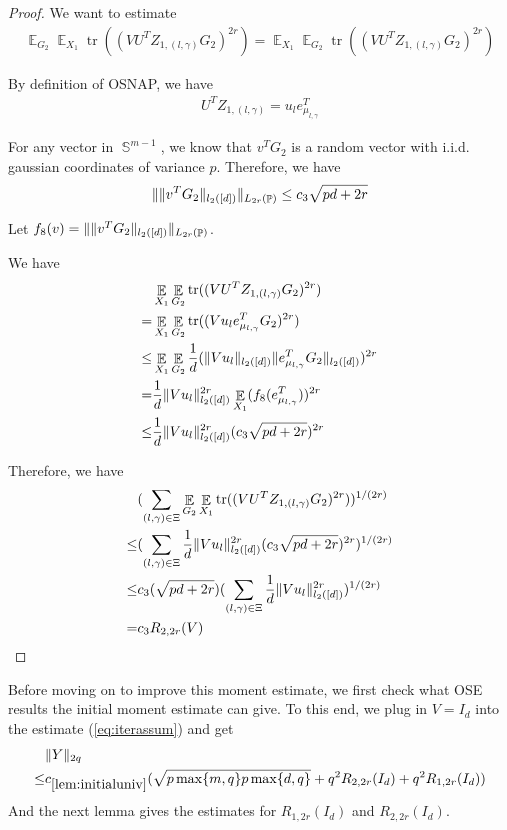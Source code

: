 \documentclass[11pt]{amsart}
\numberwithin{equation}{section}
\numberwithin{equation}{section}
\DeclareMathOperator{\E}{\mathbb{E}}
\DeclareMathOperator{\bS}{\mathbb{S}}
\DeclareMathOperator{\Pb}{\mathbb{P}}
\DeclareMathOperator*{\tr}{tr}
\DeclarePairedDelimiter{\norm}{\lVert}{\rVert}
\begin{document}
\begin{proof}
We want to estimate
\begin{align*}
    \E_{G_2}\E_{X_1}\tr((VU^TZ_{1,(l,\gamma)}G_2)^{2r})=\E_{X_1}\E_{G_2}\tr((VU^TZ_{1,(l,\gamma)}G_2)^{2r})
\end{align*}

By definition of OSNAP, we have
\begin{align*}
    U^TZ_{1,(l,\gamma)}=u_le_{\mu_{l,\gamma}}^T
\end{align*}

For any vector in $\bS^{m-1}$, we know that $v^TG_2$ is a random vector with i.i.d. gaussian coordinates of variance $p$. Therefore, we have
\begin{align*}
    \norm{\norm{v^TG_2}_{l_2([d])}}_{L_{2r}(\Pb)} \le c_3 \sqrt{pd+2r}
\end{align*}

Let $f_8(v)=\norm{\norm{v^TG_2}_{l_2([d])}}_{L_{2r}(\Pb)}$.

We have
\begin{align*}
&\E_{X_1}\E_{G_2}\tr((VU^TZ_{1,(l,\gamma)}G_2)^{2r}) \\ = & \E_{X_1}\E_{G_2}\tr((Vu_le_{\mu_{l,\gamma}}^TG_2)^{2r})
\\ \le &\E_{X_1}\E_{G_2}\frac{1}{d}(\norm{V u_l}_{l_2([d])}\norm{e_{\mu_{l,\gamma}}^TG_2}_{l_2([d])})^{2r}
\\ = & \frac{1}{d}\norm{V u_l}_{l_2([d])}^{2r}\E_{X_1} (f_8(e_{\mu_{l,\gamma}}^T))^{2r}
\\ \le & \frac{1}{d}\norm{V u_l}_{l_2([d])}^{2r} (c_3\sqrt{pd+2r})^{2r}
\end{align*}

Therefore, we have
\begin{align*}
    & (\sum\limits_{(l,\gamma) \in \Xi}\E_{G_2}\E_{X_1}\tr((VU^TZ_{1,(l,\gamma)}G_2)^{2r}))^{1/(2r)}
    \\ \le & (\sum\limits_{(l,\gamma) \in \Xi}\frac{1}{d}\norm{V u_l}_{l_2([d])}^{2r} (c_3\sqrt{pd+2r})^{2r})^{1/(2r)}
    \\ \le & c_3(\sqrt{pd+2r}) (\sum\limits_{(l,\gamma) \in \Xi}\frac{1}{d}\norm{Vu_l}_{l_2([d])}^{2r})^{1/(2r)}
    \\=& c_3R_{2,2r}(V)
\end{align*}




\end{proof}

Before moving on to improve this moment estimate, we first check what OSE results the initial moment estimate can give. To this end, we plug in $V=I_d$ into the estimate (\ref{eq:iterassum}) and get
\begin{align*}
    &\norm{Y}_{2q} \\\le&  c_{\ref{lem:initialuniv}}(\sqrt{p\max\{m,q\}p\max\{d,q\}} + q^{2}R_{2,2r}(I_d) + q^{2}R_{1,2r}(I_d))
\end{align*}
And the next lemma gives the estimates for $R_{1,2r}(I_d)$ and $R_{2,2r}(I_d)$.
\end{document}
